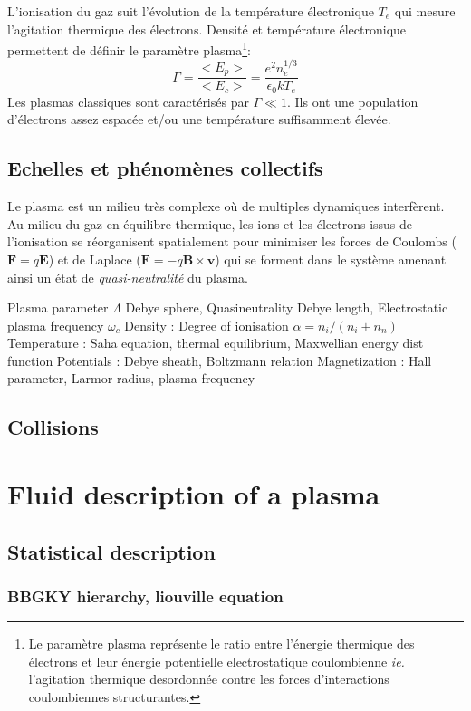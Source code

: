 			L'ionisation du gaz suit l'évolution de la température électronique $T_e$ qui
			mesure l'agitation thermique des électrons. Densité et température
			électronique permettent de définir le paramètre plasma\footnote{Le
			paramètre plasma représente le ratio entre l'énergie thermique des électrons
			et leur énergie potentielle electrostatique coulombienne \emph{ie.}
			l'agitation thermique desordonnée contre les forces d'interactions
			coulombiennes structurantes.}:
				$$\Gamma=\frac{<E_p>}{<E_c>}=\frac{e^2n_e^{1/3}}{\epsilon_0 kT_e}$$
			Les plasmas classiques sont caractérisés par $\Gamma\ll 1$. Ils ont une
			population d'électrons assez espacée et/ou une température suffisamment élevée. 
			
		\subsection{Echelles et phénomènes collectifs}
			Le plasma est un milieu très complexe où de multiples dynamiques interfèrent. 
			Au milieu du gaz en équilibre thermique, les ions et les électrons issus
			de l'ionisation se réorganisent spatialement pour minimiser les forces
			de Coulombs ($\mathbf F=q\mathbf E$) et de Laplace ($\mathbf F=-q\mathbf
			B\times\mathbf v$) qui se forment dans le système amenant ainsi un état de
			\emph{quasi-neutralité} du plasma. 
			
			
		 Plasma parameter $\Lambda$ Debye sphere, Quasineutrality Debye length,
		Electrostatic plasma frequency $\omega_c$
		 Density : Degree of ionisation $\alpha=n_i/(n_i+n_n)$
			Temperature : Saha equation, thermal equilibrium, Maxwellian energy dist function
			Potentials : Debye sheath, Boltzmann relation
			Magnetization : Hall parameter, Larmor radius, plasma frequency
		\subsection{Collisions}
		
	\section{Fluid description of a plasma}
		\subsection{Statistical description}
			\subsubsection{BBGKY hierarchy, liouville equation}
